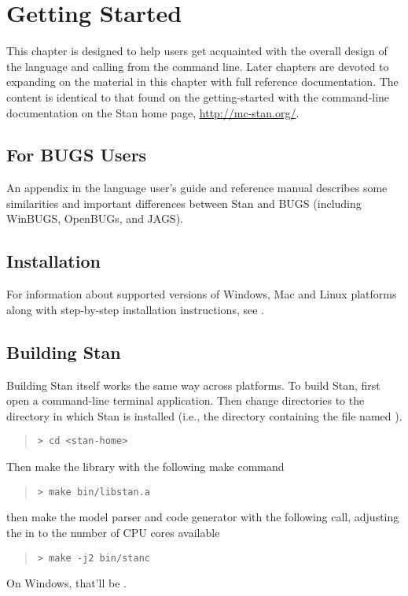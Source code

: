 \chapter{Getting Started}

\noindent
This chapter is designed to help users get acquainted with the overall
design of the \Stan language and calling \Stan from the command line.
Later chapters are devoted to expanding on the material in this
chapter with full reference documentation.  The content is identical
to that found on the getting-started with the command-line
documentation on the Stan home page, \url{http://mc-stan.org/}.

\section{For BUGS Users}

An appendix in the language user's guide and reference manual
describes some similarities and important differences between Stan and
BUGS (including WinBUGS, OpenBUGs, and JAGS).


\section{Installation}

For information about supported versions of Windows, Mac and Linux
platforms along with step-by-step installation instructions, see
.

\section{Building Stan}

Building Stan itself works the same way across platforms.
To build Stan, first open a command-line terminal application.  Then change
directories to the directory in which Stan is installed (i.e., the
directory containing the file named ).
%
\begin{quote}
\begin{Verbatim}[fontshape=sl]
> cd <stan-home>
\end{Verbatim}
\end{quote}
%
Then make the library with the following make command
%
\begin{quote}
\begin{Verbatim}[fontshape=sl]
> make bin/libstan.a
\end{Verbatim}
\end{quote}
%
then make the model parser and code generator with the following call,
adjusting the  in  to the number of CPU cores
available 
%
\begin{quote}
\begin{Verbatim}[fontshape=sl]
> make -j2 bin/stanc
\end{Verbatim}
\end{quote}
%
On Windows, that'll be .  

